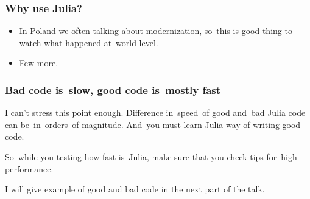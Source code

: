 \documentclass[10pt,t]{beamer}
\begin{document}
\begin{frame}
  \frametitle{Why use Julia?}


  \begin{itemize}

  \item In Poland we often talking about modernization, so~this is
    good thing to watch what happened at~world level.



  \item Few more.

  \end{itemize}

\end{frame}





\begin{frame}
  \frametitle{Bad code is~\alert{slow}, good code is~\alert{mostly}
    fast}


  I can't stress this point enough. Difference in~speed~of good
  and~bad Julia code can be~in~\alert{orders~of magnitude}. And~you
  \alert{must} learn Julia way of writing good code.

  So~while you testing how fast is~Julia, make sure that you check
  tips for~high performance.

  I will give example of good and bad code in the next part of the
  talk.

\end{frame}
\end{document}
